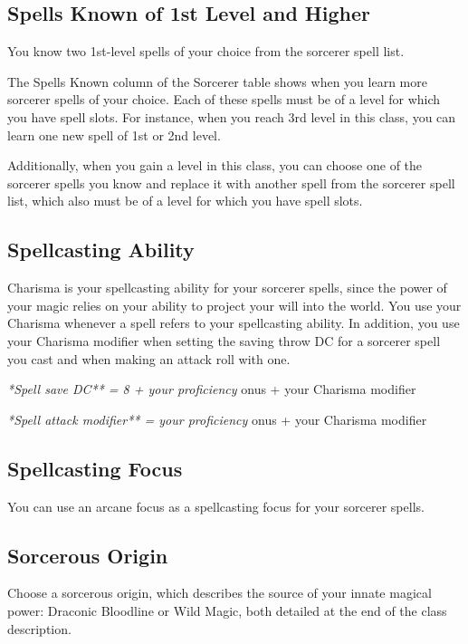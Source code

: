\subsection{Spells Known of 1st Level and Higher}

You know two 1st-level spells of your choice from the sorcerer spell list.

The Spells Known column of the Sorcerer table shows when you learn more sorcerer spells of your choice. Each of these spells must be of a level for which you have spell slots. For instance, when you reach 3rd level in this class, you can learn one new spell of 1st or 2nd level.

Additionally, when you gain a level in this class, you can choose one of the sorcerer spells you know and replace it with another spell from the sorcerer spell list, which also must be of a level for which you have spell slots.

\subsection{Spellcasting Ability}

Charisma is your spellcasting ability for your sorcerer spells, since the power of your magic relies on your ability to project your will into the world. You use your Charisma whenever a spell refers to your spellcasting ability. In addition, you use your Charisma modifier when setting the saving throw DC for a sorcerer spell you cast and when making an attack roll with one.

\textit{*Spell save DC** = 8 + your proficiency }onus + your Charisma modifier

\textit{*Spell attack modifier** = your proficiency }onus + your Charisma modifier

\subsection{Spellcasting Focus}

You can use an arcane focus as a spellcasting focus for your sorcerer spells.

\subsection{Sorcerous Origin}

Choose a sorcerous origin, which describes the source of your innate magical power: Draconic Bloodline or Wild Magic, both detailed at the end of the class description.

